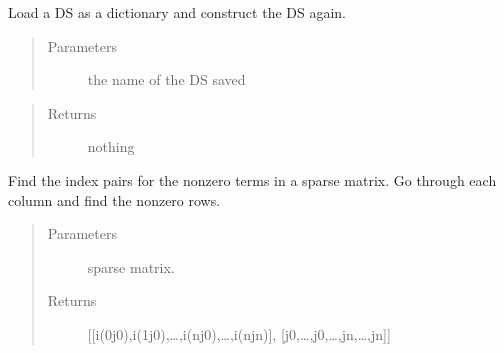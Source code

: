 \documentclass[letterpaper,10pt,english]{sphinxmanual}
\begin{document}
\begin{fulllineitems}
\label{\detokenize{index:DictionarySparseMatrix.load_dict}}
Load a DS as a dictionary and construct the DS again.
\begin{quote}\begin{description}
\item[{Parameters}] \leavevmode
{} \textendash{} the name of the DS saved

\end{description}\end{quote}

\begin{sphinxVerbatim}[commandchars=\\\{\}]
\PYG{p}{[}\PYG{p}{]}\PYG{p}{[}\PYG{p}{]}
\PYG{p}{[}\PYG{p}{]}\PYG{p}{[}\PYG{p}{]}
\PYG{p}{[}\PYG{p}{]}\PYG{p}{[}\PYG{p}{]}
\end{sphinxVerbatim}
\begin{quote}\begin{description}
\item[{Returns}] \leavevmode
nothing

\end{description}\end{quote}

\end{fulllineitems}


\begin{fulllineitems}
\label{\detokenize{index:DictionarySparseMatrix.nonzero_bycol}}
Find the index pairs for the nonzero terms in a sparse matrix.
Go through each column and find the nonzero rows.
\begin{quote}\begin{description}
\item[{Parameters}] \leavevmode
{} \textendash{} sparse matrix.

\item[{Returns}] \leavevmode
{[}{[}i(0j0),i(1j0),…,i(nj0),…,i(njn){]},    {[}j0,…,j0,…,jn,…,jn{]}{]}

\end{description}\end{quote}

\end{fulllineitems}
\end{document}
